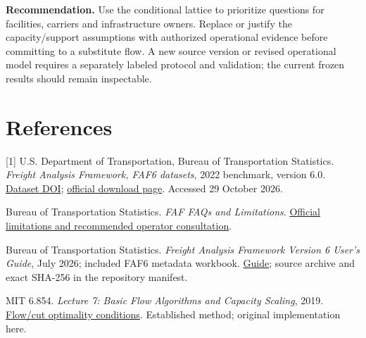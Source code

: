 \documentclass[11pt]{article}
\newcommand{\src}[2]{\href{#1}{#2}}
\begin{document}
\textbf{Recommendation.} Use the conditional lattice to prioritize questions for facilities, carriers and infrastructure owners. Replace or justify the capacity/support assumptions with authorized operational evidence before committing to a substitute flow. A new source version or revised operational model requires a separately labeled protocol and validation; the current frozen results should remain inspectable.

\section*{References}
\small
[1] U.S. Department of Transportation, Bureau of Transportation Statistics. \textit{Freight Analysis Framework, FAF6 datasets}, 2022 benchmark, version 6.0. \src{https://doi.org/10.21949/fhgm-g335}{Dataset DOI}; \src{https://www.bts.gov/faf}{official download page}. Accessed 29 October 2026.\par
[2] Bureau of Transportation Statistics. \textit{FAF FAQs and Limitations}. \src{https://www.bts.gov/faf/faqs}{Official limitations and recommended operator consultation}.\par
[3] Bureau of Transportation Statistics. \textit{Freight Analysis Framework Version 6 User's Guide}, July 2026; included FAF6 metadata workbook. \src{https://faf.ornl.gov/faf6/data/FAF6\%20User\%20Guide.pdf}{Guide}; source archive and exact SHA-256 in the repository manifest.\par
[4] MIT 6.854. \textit{Lecture 7: Basic Flow Algorithms and Capacity Scaling}, 2019. \src{https://courses.csail.mit.edu/6.854/19/Notes/n07-flow_computation.html}{Flow/cut optimality conditions}. Established method; original implementation here.
\end{document}
